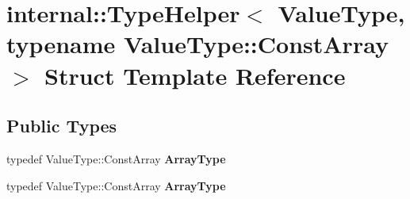 \hypertarget{structinternal_1_1_type_helper_3_01_value_type_00_01typename_01_value_type_1_1_const_array_01_4}{}\section{internal\+:\+:Type\+Helper$<$ Value\+Type, typename Value\+Type\+:\+:Const\+Array $>$ Struct Template Reference}
\label{structinternal_1_1_type_helper_3_01_value_type_00_01typename_01_value_type_1_1_const_array_01_4}
\subsection*{Public Types}
\begin{DoxyCompactItemize}
\item 
typedef Value\+Type\+::\+Const\+Array {\bfseries Array\+Type}\hypertarget{structinternal_1_1_type_helper_3_01_value_type_00_01typename_01_value_type_1_1_const_array_01_4_a88c3a7bbff09fdd44ce6980f8122ba05}{}\label{structinternal_1_1_type_helper_3_01_value_type_00_01typename_01_value_type_1_1_const_array_01_4_a88c3a7bbff09fdd44ce6980f8122ba05}

\item 
typedef Value\+Type\+::\+Const\+Array {\bfseries Array\+Type}\hypertarget{structinternal_1_1_type_helper_3_01_value_type_00_01typename_01_value_type_1_1_const_array_01_4_a88c3a7bbff09fdd44ce6980f8122ba05}{}\label{structinternal_1_1_type_helper_3_01_value_type_00_01typename_01_value_type_1_1_const_array_01_4_a88c3a7bbff09fdd44ce6980f8122ba05}

\end{DoxyCompactItemize}
